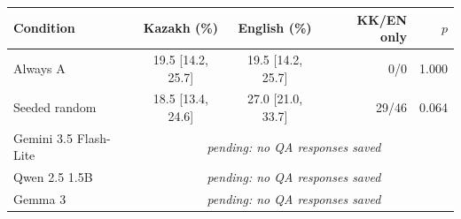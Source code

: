 \begin{tabular}{@{}lccrr@{}}
\toprule
Condition & Kazakh (\%) & English (\%) & KK/EN only & $p$ \\
\midrule
Always A & 19.5 {\scriptsize[14.2, 25.7]} & 19.5 {\scriptsize[14.2, 25.7]} & 0/0 & 1.000 \\
Seeded random & 18.5 {\scriptsize[13.4, 24.6]} & 27.0 {\scriptsize[21.0, 33.7]} & 29/46 & 0.064 \\
Gemini 3.5 Flash-Lite & \multicolumn{4}{c}{\textit{pending: no QA responses saved}} \\
Qwen 2.5 1.5B & \multicolumn{4}{c}{\textit{pending: no QA responses saved}} \\
Gemma 3 & \multicolumn{4}{c}{\textit{pending: no QA responses saved}} \\
\bottomrule
\end{tabular}
